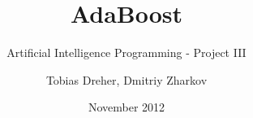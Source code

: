 
 

\title{AdaBoost}
\subtitle{Artificial Intelligence Programming - Project III}
\author{Tobias Dreher, Dmitriy Zharkov}
\date{November 2012}
\newcommand{\covertitle}{AdaBoost}
\newcommand{\coversubtitle}{Artificial Intelligence Programming - Project III}
\newcommand{\coverauthor}{Tobias Dreher, Dmitriy Zharkov}
\newcommand{\coverdate}{November 2012}



  
  \newpage

  \renewcommand{\thepage}{\Roman{page}}
  \setcounter{page}{1}
  
  \begin{spacing}{1.3}
	  \setcounter{tocdepth}{1}
	  \tableofcontents
  \end{spacing}
  \newpage

  \renewcommand{\thepage}{\arabic{page}}
  \setcounter{page}{1}

  
  


